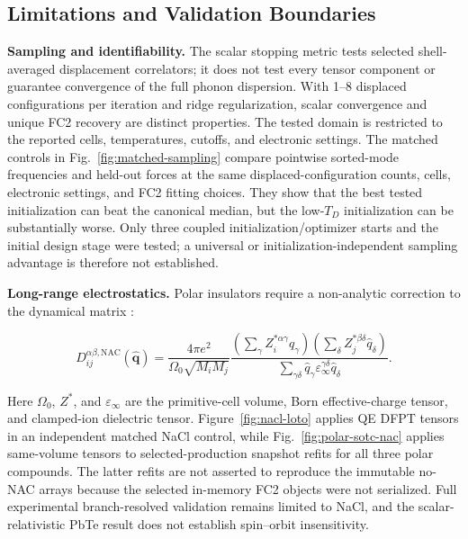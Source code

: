 \documentclass[aps,prb,reprint,amsmath,amssymb,floatfix]{revtex4-2}
\begin{document}
\color{revisionblue}
\subsection{Limitations and Validation Boundaries}\label{limitations-and-validation-boundaries}
\color{black}

\color{revisionblue}
\textbf{Sampling and identifiability.} The scalar stopping metric tests selected
shell-averaged displacement correlators; it does not test every tensor component
or guarantee convergence of the full phonon dispersion. With 1--8 displaced
configurations per iteration and ridge regularization, scalar convergence and
unique FC2 recovery are distinct properties. The tested domain is restricted
to the reported cells, temperatures, cutoffs, and electronic settings.
The matched controls in Fig.~\ref{fig:matched-sampling} compare pointwise
sorted-mode frequencies and held-out forces at the same displaced-configuration
counts, cells, electronic settings, and FC2 fitting choices. They show that the
best tested initialization can beat the canonical median, but the low-\(T_D\)
initialization can be substantially worse. Only three coupled
initialization/optimizer starts and the initial design stage were tested; a
universal or initialization-independent sampling advantage is therefore not
established.
\color{black}

\color{revisionblue}
\textbf{Long-range electrostatics.} Polar insulators require a non-analytic
correction to the dynamical matrix \cite{ref39}:
\color{black}

\color{revisionblue}
\begin{equation*}
D_{ij}^{\alpha\beta,\text{NAC}}(\hat{\mathbf{q}}) = \frac{4\pi e^2}{\Omega_0\sqrt{M_iM_j}} \frac{(\sum_\gamma Z_i^{*\alpha\gamma}\hat{q}_\gamma)(\sum_\delta Z_j^{*\beta\delta}\hat{q}_\delta)}{\sum_{\gamma\delta}\hat{q}_\gamma\varepsilon_\infty^{\gamma\delta}\hat{q}_\delta}.
\end{equation*}
\color{black}

\color{revisionblue}
Here \(\Omega_0\), \(Z^*\), and \(\varepsilon_\infty\) are the primitive-cell
volume, Born effective-charge tensor, and clamped-ion dielectric tensor.
Figure~\ref{fig:nacl-loto} applies QE DFPT tensors in an independent matched
NaCl control, while Fig.~\ref{fig:polar-sotc-nac} applies same-volume tensors to
selected-production snapshot refits for all three polar compounds. The latter
refits are not asserted to reproduce the immutable no-NAC arrays because the
selected in-memory FC2 objects were not serialized. Full experimental
branch-resolved validation remains limited to NaCl, and the scalar-relativistic
PbTe result does not establish spin--orbit insensitivity.
\color{black}
\end{document}
